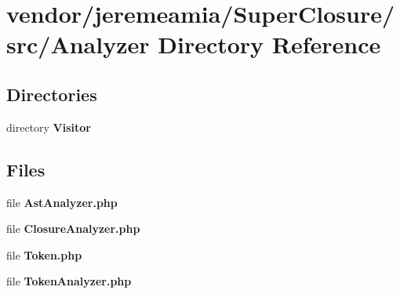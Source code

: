 \section{vendor/jeremeamia/\+Super\+Closure/src/\+Analyzer Directory Reference}
\label{dir_527ca3e7e3ceb0aa7015f68c0e715e5b}
\subsection*{Directories}
\begin{DoxyCompactItemize}
\item 
directory {\bf Visitor}
\end{DoxyCompactItemize}
\subsection*{Files}
\begin{DoxyCompactItemize}
\item 
file {\bf Ast\+Analyzer.\+php}
\item 
file {\bf Closure\+Analyzer.\+php}
\item 
file {\bf Token.\+php}
\item 
file {\bf Token\+Analyzer.\+php}
\end{DoxyCompactItemize}
